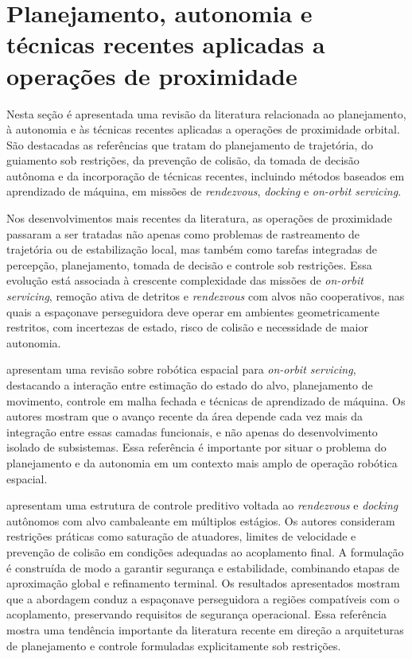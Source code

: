 \section{Planejamento, autonomia e técnicas recentes aplicadas a operações de proximidade}
\label{sec_planejamento_autonomia_tecnicas_recentes}

Nesta seção é apresentada uma revisão da literatura relacionada ao planejamento, à autonomia e às técnicas recentes aplicadas a operações de proximidade orbital. São destacadas as referências que tratam do planejamento de trajetória, do guiamento sob restrições, da prevenção de colisão, da tomada de decisão autônoma e da incorporação de técnicas recentes, incluindo métodos baseados em aprendizado de máquina, em missões de \textit{rendezvous}, \textit{docking} e \textit{on-orbit servicing}.

Nos desenvolvimentos mais recentes da literatura, as operações de proximidade passaram a ser tratadas não apenas como problemas de rastreamento de trajetória ou de estabilização local, mas também como tarefas integradas de percepção, planejamento, tomada de decisão e controle sob restrições. Essa evolução está associada à crescente complexidade das missões de \textit{on-orbit servicing}, remoção ativa de detritos e \textit{rendezvous} com alvos não cooperativos, nas quais a espaçonave perseguidora deve operar em ambientes geometricamente restritos, com incertezas de estado, risco de colisão e necessidade de maior autonomia.

\cite{alizadeh2024survey} apresentam uma revisão sobre robótica espacial para \textit{on-orbit servicing}, destacando a interação entre estimação do estado do alvo, planejamento de movimento, controle em malha fechada e técnicas de aprendizado de máquina. Os autores mostram que o avanço recente da área depende cada vez mais da integração entre essas camadas funcionais, e não apenas do desenvolvimento isolado de subsistemas. Essa referência é importante por situar o problema do planejamento e da autonomia em um contexto mais amplo de operação robótica espacial.

\cite{dong2022safe} apresentam uma estrutura de controle preditivo voltada ao \textit{rendezvous} e \textit{docking} autônomos com alvo cambaleante em múltiplos estágios. Os autores consideram restrições práticas como saturação de atuadores, limites de velocidade e prevenção de colisão em condições adequadas ao acoplamento final. A formulação é construída de modo a garantir segurança e estabilidade, combinando etapas de aproximação global e refinamento terminal. Os resultados apresentados mostram que a abordagem conduz a espaçonave perseguidora a regiões compatíveis com o acoplamento, preservando requisitos de segurança operacional. Essa referência mostra uma tendência importante da literatura recente em direção a arquiteturas de planejamento e controle formuladas explicitamente sob restrições.

